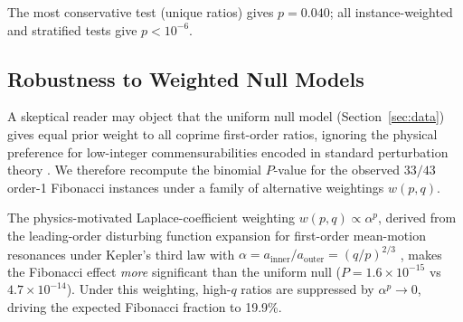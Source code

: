 \documentclass[twocolumn,11pt]{article}
\begin{document}
The most conservative test (unique ratios) gives $p = 0.040$; all
instance-weighted and stratified tests give $p < 10^{-6}$.

\subsection{Robustness to Weighted Null Models}
\label{sec:weighted_null}

A skeptical reader may object that the uniform null model
(Section~\ref{sec:data}) gives equal prior weight to all coprime
first-order ratios, ignoring the physical preference for low-integer
commensurabilities encoded in standard perturbation theory
\citep{murray1999,peale1976}. We therefore recompute the binomial
$P$-value for the observed $33/43$ order-1 Fibonacci instances under
a family of alternative weightings $w(p,q)$.

\begin{table}[ht]
\centering
\small
\caption{Binomial $P(X \geq 33 \mid n=43)$ under alternative null
weightings of the nine coprime first-order ratios with $p \leq 10$.}
\label{tab:weighted_null}
\end{table}

The physics-motivated Laplace-coefficient weighting
$w(p,q) \propto \alpha^p$, derived from the leading-order disturbing
function expansion for first-order mean-motion resonances under
Kepler's third law with $\alpha = a_\mathrm{inner}/a_\mathrm{outer}
= (q/p)^{2/3}$ \citep{murray1999}, makes the Fibonacci effect
\emph{more} significant than the uniform null ($P = 1.6 \times
10^{-15}$ vs $4.7 \times 10^{-14}$). Under this weighting, high-$q$
ratios are suppressed by $\alpha^p \to 0$, driving the expected
Fibonacci fraction to 19.9\%.
\end{document}
